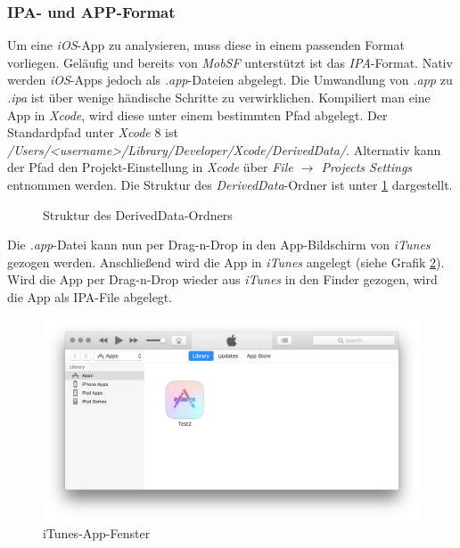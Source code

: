 \subsubsection{IPA- und APP-Format}
Um eine \textit{iOS}-App zu analysieren, muss diese in einem passenden Format vorliegen. Geläufig und bereits von \textit{MobSF} unterstützt ist das \textit{IPA}-Format. Nativ werden \textit{iOS}-Apps jedoch als \textit{.app}-Dateien abgelegt. Die Umwandlung von \textit{.app} zu \textit{.ipa} ist über wenige händische Schritte zu verwirklichen. Kompiliert man eine App in \textit{Xcode}, wird diese unter einem bestimmten Pfad abgelegt. Der Standardpfad unter \textit{Xcode} 8 ist \textit{/Users/<username>/Library/Developer/Xcode/DerivedData/}. Alternativ kann der Pfad den Projekt-Einstellung in \textit{Xcode} über \textit{File $\rightarrow$ Projects Settings} entnommen werden. Die Struktur des \textit{DerivedData}-Ordner ist unter \ref{ref:deriveddata} dargestellt.\\

\begin{figure}
\caption{Struktur des DerivedData-Ordners}
\label{ref:deriveddata}
\end{figure}

Die \textit{.app}-Datei kann nun per Drag-n-Drop in den App-Bildschirm von \textit{iTunes} gezogen werden. Anschließend wird die App in \textit{iTunes} angelegt (siehe Grafik \ref{fig:itunes_app}). Wird die App per Drag-n-Drop wieder aus \textit{iTunes} in den Finder gezogen, wird die App als IPA-File abgelegt.

\begin{figure}[htbp]
	\centering
	\includegraphics[width=\textwidth]{bilder/pentest_mobile_anwendungen/weiterentw_mobsf/itunes_app.png}
	\caption{iTunes-App-Fenster}
	\label{fig:itunes_app}
\end{figure}

